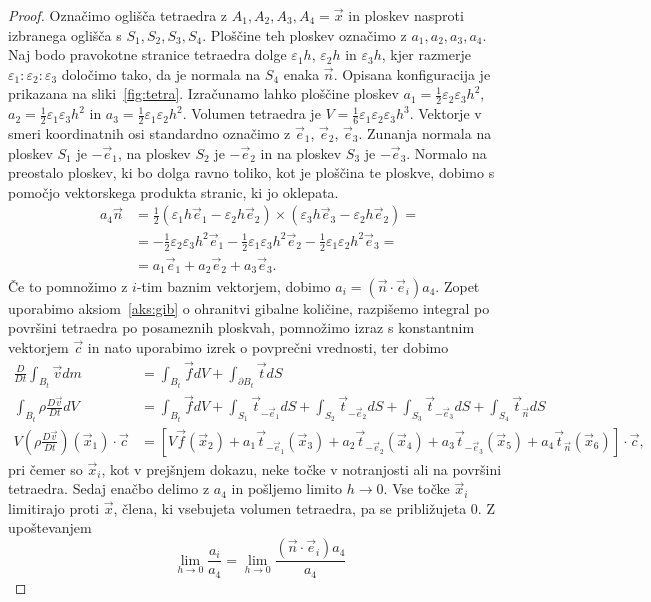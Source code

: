 \documentclass[12pt,a4paper,twoside]{article}
\theoremstyle{definition} %
\theoremstyle{plain} %
\numberwithin{equation}{section}
\newcommand{\eps}{\varepsilon}
\newcommand{\DD}[2]{\ensuremath{\frac{D #1}{D #2}}}
\newcommand{\DDt}[1]{\DD{#1}{t}}
\newcommand{\vv}{\vec{v}}
\newcommand{\vt}{\vec{t}}
\newcommand{\vc}{\vec{c}}
\newcommand{\vn}{\vec{n}}
\newcommand{\vf}{\vec{f}}
\newcommand{\vx}{\vec{x}}
\newcommand{\ei}{\vec{e}_1}
\newcommand{\ej}{\vec{e}_2}
\newcommand{\ek}{\vec{e}_3}
\begin{document}
\begin{proof}
Označimo oglišča tetraedra z $A_1, A_2, A_3, A_4 = \vx$ in ploskev nasproti izbranega oglišča s
$S_1, S_2, S_3, S_4$. Ploščine teh ploskev označimo z $a_1, a_2, a_3, a_4$.  Naj bodo pravokotne
stranice tetraedra dolge $\eps_1 h$, $\eps_2 h$ in $\eps_3 h$, kjer razmerje $\eps_1 : \eps_2 :
\eps_3$ določimo tako, da je normala na $S_4$ enaka $\vn$. Opisana konfiguracija je prikazana na
sliki~\ref{fig:tetra}.  Izračunamo lahko ploščine ploskev $a_1 = \frac12 \eps_2\eps_3h^2$,
$a_2 = \frac12 \eps_1\eps_3h^2$ in $a_3 = \frac12 \eps_1\eps_2h^2$.  Volumen tetraedra je $V =
\frac16 \eps_1\eps_2\eps_3h^3$.  Vektorje v smeri koordinatnih osi standardno označimo z $\ei$,
$\ej$, $\ek$.  Zunanja normala na ploskev $S_1$ je $-\ei$, na ploskev $S_2$ je $-\ej$ in na ploskev
$S_3$ je $-\ek$. Normalo na preostalo ploskev, ki bo dolga ravno toliko, kot je ploščina te ploskve,
dobimo s pomočjo vektorskega produkta stranic, ki jo oklepata.
\begin{align*}
  a_4\vn &= \frac12 (\eps_1h \ei - \eps_2h \ej) \times (\eps_3h \ek - \eps_2h
  \ej) = \\ &=
  -\frac12 \eps_2\eps_3 h^2\ei
  -\frac12 \eps_1\eps_3 h^2\ej
  -\frac12 \eps_1\eps_2 h^2\ek = \\
  &= a_1 \ei + a_2 \ej + a_3 \ek.
\end{align*}
Če to pomnožimo z $i$-tim baznim vektorjem, dobimo $a_i = (\vn\cdot\vec{e}_i)
a_4$.
Zopet uporabimo aksiom~\ref{aks:gib} o ohranitvi gibalne količine, razpišemo integral po površini
tetraedra po posameznih ploskvah, pomnožimo izraz s konstantnim vektorjem $\vc$ in nato uporabimo
izrek o povprečni vrednosti, ter dobimo
\begin{align*}
  \DDt{} \int_{B_t} \vv dm &= \int_{B_t} \vf dV + \int_{\partial {B_t}} \vt dS \\
\int_{B_t} \rho\DDt{\vv} dV &= \int_{B_t} \vf dV +
  \int_{S_1} \vt_{-\ei} dS +
  \int_{S_2} \vt_{-\ej} dS +
  \int_{S_3} \vt_{-\ek} dS +
  \int_{S_4} \vt_{\vn} dS
  \\
  V (\rho\DDt{\vv})(\vx_1)\cdot\vc &= \left[V \vf(\vx_2) +
  a_1 \vt_{-\ei}(\vx_3) + a_2 \vt_{-\ej}(\vx_4) + a_3 \vt_{-\ek}(\vx_5) + a_4
\vt_{\vn}(\vx_6)\right]\cdot \vc,
\end{align*}
pri čemer so $\vx_i$, kot v prejšnjem dokazu, neke točke v notranjosti ali na
površini tetraedra. Sedaj enačbo delimo z $a_4$ in pošljemo limito $h \to 0$.
Vse točke $\vx_i$ limitirajo proti $\vx$, člena, ki vsebujeta volumen tetraedra,
pa se približujeta 0. Z upoštevanjem
\[
  \lim_{h\to0} \frac{a_i}{a_4} = \lim_{h\to0}\frac{(\vn\cdot\vec{e}_i) a_4}{a_4}
\]
\end{proof}
\end{document}
